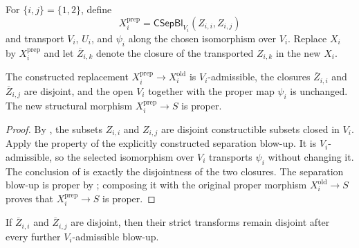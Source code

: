 \begin{definition}
  \label{def:nagata-two-open-prepared-boundaries}

  For $\{i,j\}=\{1,2\}$, define
  \[
    X_i^{\mathrm{prep}}
      =\mathsf{CSepBl}_{V_i}(Z_{i,i},Z_{i,j})
  \]
  and transport $V_i$, $U_i$, and $\psi_i$ along the chosen isomorphism over
  $V_i$.  Replace $X_i$ by $X_i^{\mathrm{prep}}$ and let
  $\overline Z_{i,k}$ denote the closure of the transported $Z_{i,k}$ in the
  new $X_i$.
\end{definition}

\begin{lemma}
  \label{lemma:nagata-prepared-boundaries}

  The constructed replacement $X_i^{\mathrm{prep}}\to X_i^{\mathrm{old}}$
  is $V_i$-admissible, the closures
  $\overline Z_{i,i}$ and $\overline Z_{i,j}$ are disjoint, and the open
  $V_i$ together with the proper map $\psi_i$ is unchanged.  The new
  structural morphism $X_i^{\mathrm{prep}}\to S$ is proper.
\end{lemma}

\begin{proof}
  By , the subsets $Z_{i,i}$ and
  $Z_{i,j}$ are disjoint constructible subsets closed in $V_i$.  Apply the
  property of the explicitly constructed separation blow-up.  It is
  $V_i$-admissible, so the selected isomorphism over $V_i$ transports
  $\psi_i$ without changing it.  The conclusion of
   is exactly the
  disjointness of the two closures.  The separation blow-up is proper by
  ; composing it with the original proper
  morphism $X_i^{\mathrm{old}}\to S$ proves that
  $X_i^{\mathrm{prep}}\to S$ is proper.
\end{proof}


\begin{lemma}
  \label{lemma:nagata-boundary-disjoint-persists}

  If $\overline Z_{i,i}$ and $\overline Z_{i,j}$ are disjoint, then their
  strict transforms remain disjoint after every further $V_i$-admissible
  blow-up.
\end{lemma}

